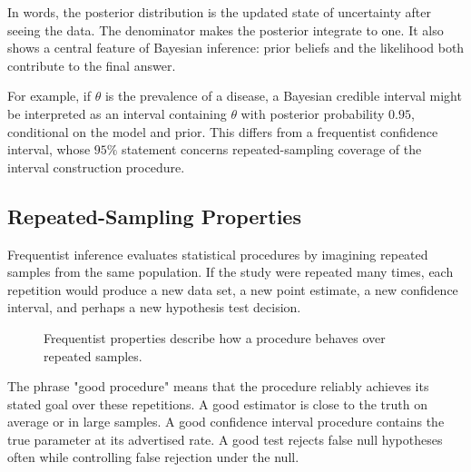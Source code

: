 In words, the posterior distribution is the updated state of uncertainty after seeing the data. The denominator makes the posterior integrate to one. It also shows a central feature of Bayesian inference: prior beliefs and the likelihood both contribute to the final answer.

For example, if $\theta$ is the prevalence of a disease, a Bayesian credible interval might be interpreted as an interval containing $\theta$ with posterior probability $0.95$, conditional on the model and prior. This differs from a frequentist confidence interval, whose $95\%$ statement concerns repeated-sampling coverage of the interval construction procedure.

\subsection{Repeated-Sampling Properties}

Frequentist inference evaluates statistical procedures by imagining repeated samples from the same population. If the study were repeated many times, each repetition would produce a new data set, a new point estimate, a new confidence interval, and perhaps a new hypothesis test decision.

\begin{figure}[H]
\centering
{}
\caption{Frequentist properties describe how a procedure behaves over repeated samples.}
\end{figure}

The phrase "good procedure" means that the procedure reliably achieves its stated goal over these repetitions. A good estimator is close to the truth on average or in large samples. A good confidence interval procedure contains the true parameter at its advertised rate. A good test rejects false null hypotheses often while controlling false rejection under the null.

